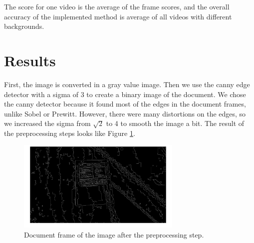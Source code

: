 \documentclass[english, paper=a4]{scrartcl}
\begin{document}
The score for one video is the average of the frame scores, and the overall accuracy of the implemented method is average of all videos with different backgrounds.

\section{Results}
First, the image is converted in a gray value image. Then we use the canny edge detector with a sigma of 3 to create a binary image of the document. We chose the canny detector because it found most of the edges in the document frames, unlike Sobel or Prewitt. However, there were many distortions on the edges, so we increased the sigma from $\sqrt{2}$ to 4 to smooth the image a bit. The result of the preprocessing steps looks like Figure \ref{fig:pre}.

\begin{figure}[h]
\centering
\includegraphics[width=0.7\textwidth]{pre.png}
\caption{Document frame of the image after the preprocessing step.}
\label{fig:pre}
\end{figure}
\end{document}
